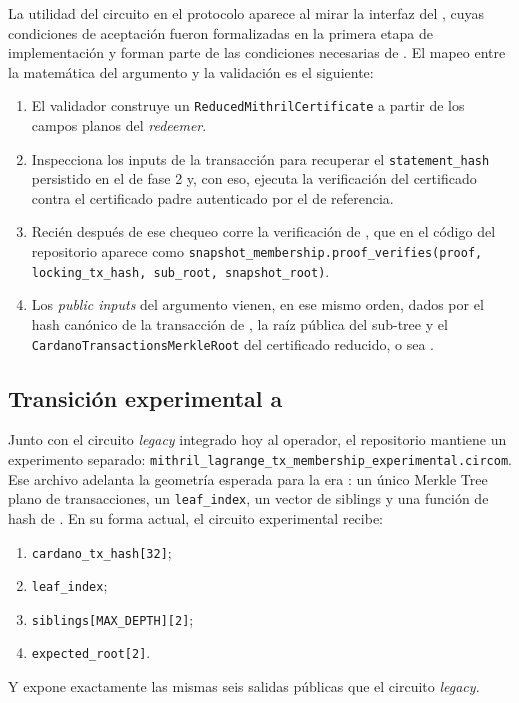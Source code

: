 La utilidad del circuito en el protocolo aparece al mirar la interfaz del \MintingValidator, cuyas condiciones de aceptación fueron formalizadas en la primera etapa de implementación y forman parte de las condiciones necesarias de \MintTx. El mapeo entre la matemática del argumento \Groth y la validación \Onchain es el siguiente:
\begin{enumerate}[noitemsep]
	\item El validador construye un \texttt{ReducedMithril\allowbreak Certificate} a partir de los campos planos del \textit{redeemer}.
	\item Inspecciona los inputs de la transacción para recuperar el \texttt{statement\_hash} persistido en el \ProofReceipt de fase 2 y, con eso, ejecuta la verificación del certificado contra el certificado padre autenticado por el \StakeDistributionUTxO de referencia.
	\item Recién después de ese chequeo corre la verificación de \TxSnapshotMembershipCircuit, que en el código del repositorio aparece como \texttt{snapshot\_membership.proof\_verifies(proof, locking\_tx\_hash, sub\_root, snapshot\_root)}.
	\item Los \textit{public inputs} \Onchain del argumento \Groth vienen, en ese mismo orden, dados por el hash canónico de la transacción de \Cardano, la raíz pública del sub-tree \SnapshotSubRoot y el \texttt{CardanoTransactionsMerkleRoot} del certificado reducido, o sea \TxSetRoot.
\end{enumerate}

\subsection{Transición experimental a \Lagrange}

Junto con el circuito \textit{legacy} integrado hoy al operador, el repositorio mantiene un experimento separado: \texttt{mithril\_lagrange\_tx\_membership\_experimental\allowbreak.circom}. Ese archivo adelanta la geometría esperada para la era \Lagrange: un único Merkle Tree plano de transacciones, un \texttt{leaf\_index}, un vector de siblings y una función de hash \MidnightPoseidonHash de \Midnight. En su forma actual, el circuito experimental recibe:
\begin{enumerate}[noitemsep]
  \item \texttt{cardano\_tx\_hash[32]};
  \item \texttt{leaf\_index};
  \item \texttt{siblings[MAX\_DEPTH][2]};
  \item \texttt{expected\_root[2]}.
\end{enumerate}
Y expone exactamente las mismas seis salidas públicas que el circuito \textit{legacy}.

